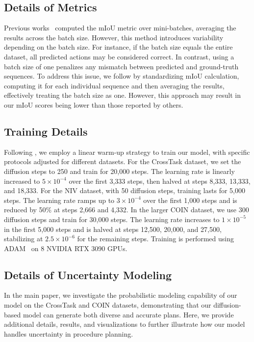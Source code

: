 \subsection{Details of Metrics }
Previous works~\citep{chang2020procedure, bi2021procedure, sun2022plate} computed the mIoU metric over mini-batches, averaging the results across the batch size. However, this method introduces variability depending on the batch size. For instance, if the batch size equals the entire dataset, all predicted actions may be considered correct. In contrast, using a batch size of one penalizes any mismatch between predicted and ground-truth sequences. To address this issue, we follow \citet{wang2023pdpp} by standardizing mIoU calculation, computing it for each individual sequence and then averaging the results, effectively treating the batch size as one. However, this approach may result in our mIoU scores being lower than those reported by others.


\subsection{Training Details} 
Following \citet{wang2023pdpp}, we employ a linear warm-up strategy to train our model, with specific protocols adjusted for different datasets. For the CrossTask dataset, we set the diffusion steps to 250 and train for 20,000 steps. The learning rate is linearly increased to \(5 \times 10^{-4}\) over the first 3,333 steps, then halved at steps 8,333, 13,333, and 18,333. For the NIV dataset, with 50 diffusion steps, training lasts for 5,000 steps. The learning rate ramps up to \(3 \times 10^{-4}\) over the first 1,000 steps and is reduced by 50\% at steps 2,666 and 4,332. In the larger COIN dataset, we use 300 diffusion steps and train for 30,000 steps. The learning rate increases to \(1 \times 10^{-5}\) in the first 5,000 steps and is halved at steps 12,500, 20,000, and 27,500, stabilizing at \(2.5 \times 10^{-6}\) for the remaining steps. Training is performed using ADAM~\citep{kingma2014adam} on 8 NVIDIA RTX 3090 GPUs.


\subsection{Details of Uncertainty Modeling}
In the main paper, we investigate the probabilistic modeling capability of our model on the CrossTask and COIN datasets, demonstrating that our diffusion-based model can generate both diverse and accurate plans. Here, we provide additional details, results, and visualizations to further illustrate how our model handles uncertainty in procedure planning. 

